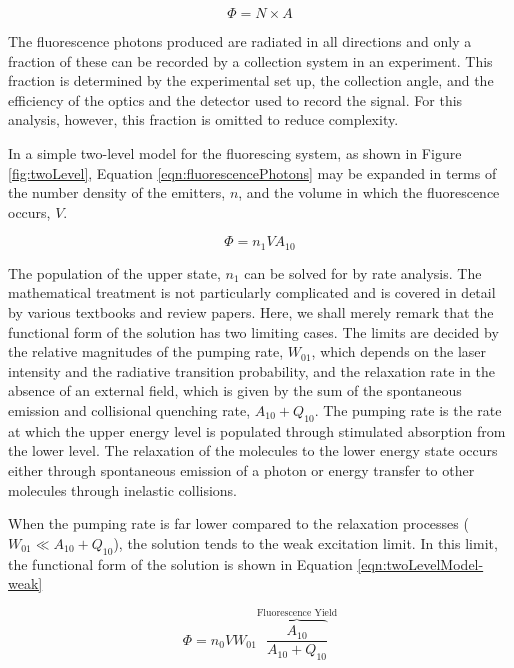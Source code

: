 \begin{equation}
  \Phi = N\times A
  \label{eqn:fluorescencePhotons}
\end{equation}

The fluorescence photons produced are radiated in all directions and only a fraction of these can be recorded by a collection system in an experiment.
This fraction is determined by the experimental set up, the collection angle, and the efficiency of the optics and the detector used to record the signal.
For this analysis, however, this fraction is omitted to reduce complexity.



In a simple two-level model for the fluorescing system, as shown in Figure \ref{fig:twoLevel}, Equation \ref{eqn:fluorescencePhotons} may be expanded in terms of the number density of the emitters, \(n\), and the volume in which the fluorescence occurs, \(V\).

\begin{equation}
  \Phi = n_1VA_{10}
\end{equation}

The population of the upper state, \(n_1\) can be solved for by rate analysis.
The mathematical treatment is not particularly complicated and is covered in detail by various textbooks and review papers.\cite{1996-eckbreth,1997-daily}
Here, we shall merely remark that the functional form of the solution has two limiting cases.
The limits are decided by the relative magnitudes of the pumping rate, \(W_{01}\), which depends on the laser intensity and the radiative transition probability, and the relaxation rate in the absence of an external field, which is given by the sum of the spontaneous emission and collisional quenching rate, \(A_{10} + Q_{10}\).
The pumping rate is the rate at which the upper energy level is populated through stimulated absorption from the lower level.
The relaxation of the molecules to the lower energy state occurs either through spontaneous emission of a photon or energy transfer to other molecules through inelastic collisions.

When the pumping rate is far lower compared to the relaxation processes (\(W_{01} \ll A_{10} + Q_{10}\)), the solution tends to the weak excitation limit.
In this limit, the functional form of the solution is shown in Equation \ref{eqn:twoLevelModel-weak}

\begin{equation}
  \Phi = n_0 V W_{01}\overbrace{\frac{A_{10}}{A_{10}+Q_{10}}}^{\text{Fluorescence Yield}}
  \label{eqn:twoLevelModel-weak}
\end{equation}

